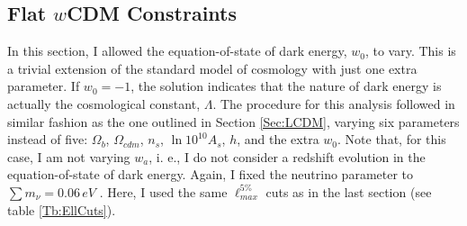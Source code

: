 
\subsection{Flat $w$CDM Constraints}\label{Sec:wCDM}
In this section, I allowed the equation-of-state of dark energy, $w_0$, to vary. This is a trivial extension of the standard model of cosmology with just one extra parameter. If $w_0 = -1$, the solution indicates that the nature of dark energy is actually the cosmological constant, $\Lambda$. The procedure for this analysis followed in similar fashion as the one outlined in Section \ref{Sec:LCDM}, varying six parameters instead of five: $\Omega_b$, $\Omega_{cdm}$, $n_s$, $\ln 10^{10} A_s$, $h$, and the extra $w_0$. Note that, for this case, I am not varying $w_a$, i. e., I do not consider a redshift evolution in the equation-of-state of dark energy. Again, I fixed the neutrino parameter to $\sum m_{\nu} = 0.06 \, eV$ \citep{2006NeutrinoReview,2014NeutrinoCosmoPlanck}. Here, I used the same $\ell_{max}^{5\%}$ cuts as in the last section (see table \ref{Tb:EllCuts}).

